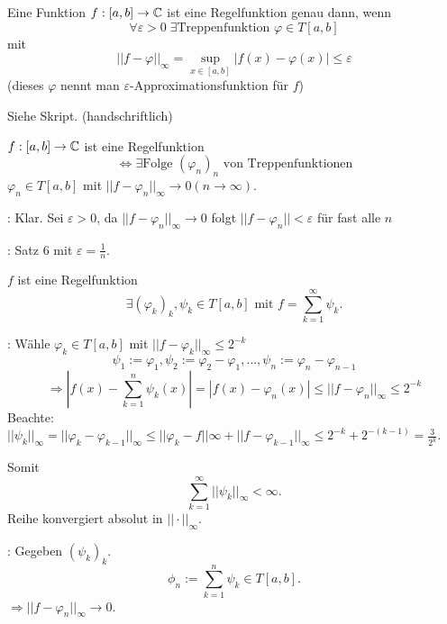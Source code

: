 \documentclass[../ana2.tex]{subfiles}
\begin{document}
\begin{satz}[Approximationssatz]
    Eine Funktion \( f:[a,b]\rightarrow \mathbb{C} \) ist 
    eine Regelfunktion genau dann, wenn 
    \[ \forall \varepsilon > 0 \; \exists 
    \text{Treppenfunktion } \varphi \in T[a,b] \]
    mit 
    \[ ||f - \varphi||_\infty 
    = \underset{x \in [a,b]}{\sup} |f(x) - \varphi(x)| 
    \leq \varepsilon \]
    (dieses \(\varphi\) nennt man \( \varepsilon \)-Approximationsfunktion
    für \(f\))
\end{satz}
\begin{bew}
    Siehe Skript. (handschriftlich)
\end{bew}
\begin{kor}
    \( f:[a,b]\rightarrow \mathbb{C} \) ist eine Regelfunktion 
    \[ \Leftrightarrow \exists \text{Folge } 
    (\varphi_n)_n \text{ von Treppenfunktionen} \]
    \( \varphi_n \in T[a,b] \) mit \( ||f-\varphi_n||_\infty 
    \rightarrow 0 (n\rightarrow \infty) \).
\end{kor}
\begin{bew}
    \gqq{\( \Leftarrow \)}: Klar. Sei \( \varepsilon > 0\), 
    da \( ||f-\varphi_n||_\infty \rightarrow 0 \) folgt 
    \( ||f-\varphi_n|| < \varepsilon \) für fast alle \(n\)
    
    \gqq{\( \Rightarrow \)}: Satz \(6\) 
    mit \( \varepsilon = \frac{1}{n} \).
\end{bew}
\begin{kor}
    \( f \) ist eine Regelfunktion
    \[ \exists (\varphi_k)_k, \psi_k \in T[a,b] 
    \text{ mit } f = \sum_{k=1}^\infty \psi_k. \]
\end{kor}
\begin{bew}
    \gqq{\( \Rightarrow \)}: Wähle \( \varphi_k \in T[a,b] \)
    mit \( ||f-\varphi_k||_\infty \leq 2^{-k} \)
    \[ \psi_1 := \varphi_1, \psi_2 := \varphi_2 - \varphi_1, 
    \ldots, \psi_n := \varphi_n - \varphi_{n-1} \]
    \[ \Rightarrow |f(x) - \sum_{k=1}^n \psi_k(x)| 
    = |f(x)-\varphi_n(x)| \leq ||f-\varphi_n||_\infty \leq 2^{-k} \]
    Beachte: \( ||\psi_k||_\infty = ||\varphi_k - \varphi_{k-1}||_\infty
    \leq ||\varphi_k-f||\infty + ||f-\varphi_{k-1}||_\infty
    \leq 2^{-k} +  2^{-(k-1)} = \frac{3}{2^k} \).

    Somit 
    \[ \sum_{k=1}^\infty ||\psi_k||_\infty < \infty. \]
    Reihe konvergiert absolut in \( ||\cdot||_\infty \).

    \gqq{\( \Leftarrow \)}: Gegeben \( (\psi_k)_k \).
    \[ \phi_n := \sum_{k=1}^n \psi_k \in T[a,b]. \]
    \( \Rightarrow ||f - \varphi_n||_\infty \rightarrow 0 \).
\end{bew}
\end{document}
